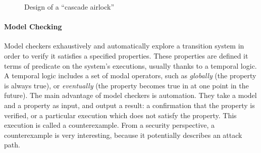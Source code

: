 \begin{figure}
  \centering 
  \caption{Design of a ``cascade airlock''}
  \label{fig:related:airlock}
\end{figure}

\paragraph{Model Checking}
%
Model checkers exhaustively and automatically explore a transition system in
order to verify it satisfies a specified properties.
%
These properties are defined it terms of predicate on the system's executions,
usually thanks to a temporal logic.
%
A temporal logic includes a set of modal operators, such as \emph{globally} (the
property is always true), or \emph{eventually} (the property becomes true in at
one point in the future).
%
The main advantage of model checkers is automation.
%
They take a model and a property as input, and output a result: a confirmation
that the property is verified, or a particular execution which does not satisfy
the property.
%
This execution is called a counterexample.
%
From a security perspective, a counterexample is very interesting, because it
potentially describes an attack path.


